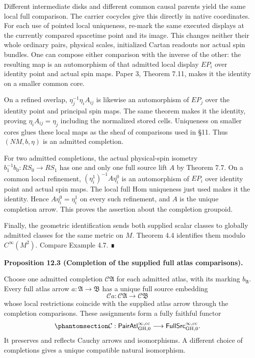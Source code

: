 \documentclass[
  english,
  11pt,
  reqno]{amsart}
\makeatletter
\newcommand{\pandocstatementheading}[1]{%
  \par\addpenalty{\@beginparpenalty}%
  \addvspace{.5\baselineskip plus .2\baselineskip minus .2\baselineskip}%
  {\normalfont\bfseries #1\par}%
  \nobreak\@afterindenttrue\@afterheading
}
\makeatother
\begin{document}
Different intermediate disks and different common causal parents yield
the same local full comparison. The carrier cocycles give this directly
in native coordinates. For each use of pointed local uniqueness, re-mark
the same executed displays at the currently compared spacetime point and
its image. This changes neither their whole ordinary pairs, physical
scales, initialized Cartan readouts nor actual spin bundles. One can
compose either comparison with the inverse of the other: the resulting
map is an automorphism of that admitted local display \(E P_i\) over
identity point and actual spin maps. Paper 3, Theorem 7.11, makes it the
identity on a smaller common core.

On a refined overlap, \(\eta_j^{-1}\eta_i A_{ij}\) is likewise an
automorphism of \(E P_j\) over the identity point and principal spin
maps. The same theorem makes it the identity, proving
\(\eta_i A_{ij}=\eta_j\) including the normalized stored cells.
Uniqueness on smaller cores glues these local maps as the sheaf of
comparisons used in §11. Thus \((N M,b,\eta)\) is an admitted
completion.

For two admitted completions, the actual physical-spin isometry
\(b_1^{-1}b_0:RS_0\to RS_1\) has one and only one full source lift \(A\)
by Theorem 7.7. On a common local refinement,
\((\eta_i^1)^{-1}A\eta_i^0\) is an automorphism of \(E P_i\) over
identity point and actual spin maps. The local full Hom uniqueness just
used makes it the identity. Hence \(A\eta_i^0=\eta_i^1\) on every such
refinement, and \(A\) is the unique completion arrow. This proves the
assertion about the completion groupoid.

Finally, the geometric identification sends both supplied scalar classes
to globally admitted classes for the same metric on \(M\). Theorem 4.4
identifies them modulo \(C^\infty(M^2)\). Compare Example 4.7. ∎

\pandocstatementheading{\protect{}\label{prop:ordinary-atlas-completion-full-hom}Proposition 12.3 (Completion of the supplied full atlas comparisons).}

Choose one admitted completion \(\mathcal C\mathfrak A\) for each
admitted atlas, with its marking \(b_{\mathfrak A}\). Every full atlas
arrow \(a:\mathfrak A\to\mathfrak B\) has a unique full source embedding
\[
\mathcal C a:\mathcal C\mathfrak A\longrightarrow\mathcal C\mathfrak B
\] whose local restrictions coincide with the supplied atlas arrow
through the completion comparisons. These assignments form a fully
faithful functor
\begin{equation}\protect\phantomsection\label{eq:ordinary-atlas-completion-functor}{
\mathcal C:
\mathsf{PairAtl}^{\infty,\mathrm{cc}}_{\mathrm{GH},0}
\longrightarrow
\mathsf{FullSrc}^{\infty,\mathrm{cc}}_{\mathrm{GH},0}.
}\end{equation} It preserves and reflects Cauchy arrows and
isomorphisms. A different choice of completions gives a unique
compatible natural isomorphism.
\end{document}
